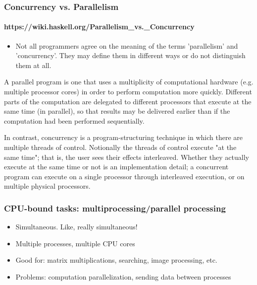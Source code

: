\documentclass{beamer}
\begin{document}
    \begin{frame}
        \frametitle{Concurrency vs. Parallelism}
        \framesubtitle{https://wiki.haskell.org/Parallelism\_vs.\_Concurrency}

        \begin{itemize}
            \item Not all programmers agree on the meaning of the terms 'parallelism' and
            'concurrency'. They may define them in different ways or do not distinguish them at all.



        \end{itemize}

        \begin{definition} A parallel program is one that uses a multiplicity of
        computational hardware (e.g. multiple processor cores) in order to perform
        computation more quickly. Different parts of the computation are delegated
        to different processors that execute at the same time (in parallel), so that
        results may be delivered earlier than if the computation had been performed sequentially.

        \end{definition}

        \begin{definition} In contrast, concurrency is a program-structuring technique
        in which there are multiple threads of control. Notionally the threads of control
        execute "at the same time"; that is, the user sees their effects interleaved.
        Whether they actually execute at the same time or not is an implementation detail;
        a concurrent program can execute on a single processor through interleaved execution,
        or on multiple physical processors.

        \end{definition}



    \end{frame}


    \begin{frame}
        \frametitle{CPU-bound tasks: multiprocessing/parallel processing}

        \begin{itemize}
            \item Simultaneous. Like, really simultaneous!
            \item Multiple processes, multiple CPU cores
            \item Good for: matrix multiplications, searching, image processing, etc.
            \item Problems: computation parallelization, sending data between processes
        \end{itemize}

    \end{frame}
\end{document}
